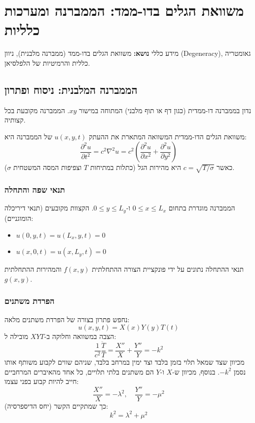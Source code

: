 \section{משוואת הגלים בדו-ממד: הממברנה ומערכות כלליות}

\begin{mainbox}{מידע כללי}
\textbf{נושא:} משוואת הגלים בדו-ממד (ממברנה מלבנית), ניוון (Degeneracy), גאומטריה כללית והרמיטיות של הלפלסיאן.
\end{mainbox}

\subsection{הממברנה המלבנית: ניסוח ופתרון}

נדון בממברנה דו-ממדית (כגון דף או תוף מלבני) המתוחה במישור $xy$. הממברנה מקובעת בכל קצותיה.

\begin{definitionbox}{משוואת הגלים הדו-ממדית}
המשוואה המתארת את ההעתק $u(x,y,t)$ של הממברנה היא:
\begin{equation}
\frac{\partial^2 u}{\partial t^2} = c^2 \nabla^2 u = c^2 \left( \frac{\partial^2 u}{\partial x^2} + \frac{\partial^2 u}{\partial y^2} \right)
\end{equation}
כאשר $c = \sqrt{T/\sigma}$ היא מהירות הגל (כתלות במתיחות $T$ וצפיפות המסה המשטחית $\sigma$).
\end{definitionbox}

\subsubsection{תנאי שפה והתחלה}
הממברנה מוגדרת בתחום $0 \le x \le L_x$ ו-$0 \le y \le L_y$. הקצוות מקובעים (תנאי דיריכלה הומוגניים):
\begin{itemize}
    \item $u(0, y, t) = u(L_x, y, t) = 0$
    \item $u(x, 0, t) = u(x, L_y, t) = 0$
\end{itemize}
תנאי ההתחלה נתונים על ידי פונקציית הצורה ההתחלתית $f(x,y)$ והמהירות ההתחלתית $g(x,y)$.

\subsubsection{הפרדת משתנים}
נחפש פתרון בצורה של הפרדת משתנים מלאה:
\begin{equation}
u(x,y,t) = X(x)Y(y)T(t)
\end{equation}
הצבה במשוואה וחלוקה ב-$XYT$ מובילה ל:
\begin{equation}
\frac{1}{c^2} \frac{\ddot{T}}{T} = \frac{X''}{X} + \frac{Y''}{Y} = -k^2
\end{equation}
מכיוון שצד שמאל תלוי בזמן בלבד וצד ימין במרחב בלבד, שניהם שווים לקבוע משותף אותו נסמן $-k^2$. בנוסף, מכיוון ש-$X$ ו-$Y$ הם משתנים בלתי תלויים, כל אחד מהאיברים המרחביים חייב להיות קבוע בפני עצמו:
\begin{equation}
\frac{X''}{X} = -\lambda^2, \quad \frac{Y''}{Y} = -\mu^2
\end{equation}
כך שמתקיים הקשר (יחס הדיספרסיה):
\begin{equation}
k^2 = \lambda^2 + \mu^2
\end{equation}

